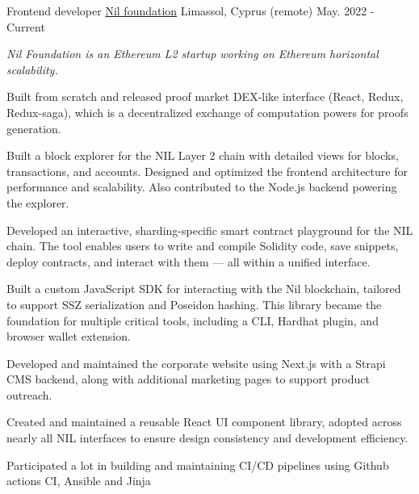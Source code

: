 

\begin{cventries}

  \cventry
    {Frontend developer} %
    {\href{https://nil.foundation}{Nil foundation}} %
    {Limassol, Cyprus (remote)} %
    {May. 2022 - Current} %
    {
      \begin{cvitems} %
      \vspace{8pt}
      \item[] {\small\textit{Nil Foundation is an Ethereum L2 startup working on Ethereum horizontal scalability.}}
      \vspace{8pt}
        \item {Built from scratch and released proof market DEX-like interface (React, Redux, Redux-saga), which is a decentralized exchange of computation powers for proofs generation.}
        \item {Built a block explorer for the NIL Layer 2 chain with detailed views for blocks, transactions, and accounts. Designed and optimized the frontend architecture for performance and scalability. Also contributed to the Node.js backend powering the explorer.}
        \item {Developed an interactive, sharding-specific smart contract playground for the NIL chain. The tool enables users to write and compile Solidity code, save snippets, deploy contracts, and interact with them — all within a unified interface.}
        \item {Built a custom JavaScript SDK for interacting with the Nil blockchain, tailored to support SSZ serialization and Poseidon hashing. This library became the foundation for multiple critical tools, including a CLI, Hardhat plugin, and browser wallet extension.}
        \item {Developed and maintained the corporate website using Next.js with a Strapi CMS backend, along with additional marketing pages to support product outreach.}
        \item {Created and maintained a reusable React UI component library, adopted across nearly all NIL interfaces to ensure design consistency and development efficiency.}
        \item {Participated a lot in building and maintaining CI/CD pipelines using Github actions CI, Ansible and Jinja}
      \end{cvitems}
    }
    {\vspace{16pt}}


\end{cventries}

